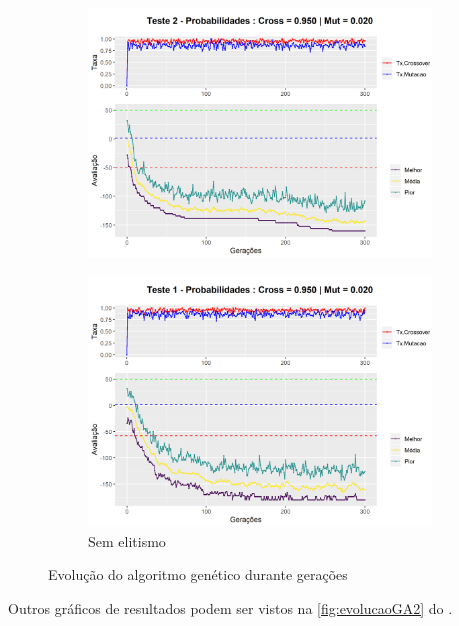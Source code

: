 \begin{figure}[h!]
\begin{subfigure}[b]{0.47\linewidth}
		\includegraphics[width=\linewidth]{imagens/graph_pc_0_950_pm_0_020_pop_50_g_300__2.png}
		\caption{}
	\end{subfigure}
	\begin{subfigure}[b]{0.47\linewidth}
		\includegraphics[width=\linewidth]{imagens/graph_pc_0_950_pm_0_020_pop_50_g_300__1_noelite.png}
		\caption{Sem elitismo}
	\end{subfigure}
\caption{Evolução do algoritmo genético durante gerações}
	\label{fig:evolucaoGA}
\end{figure}

Outros gráficos de resultados podem ser vistos na \autoref{fig:evolucaoGA2} do .